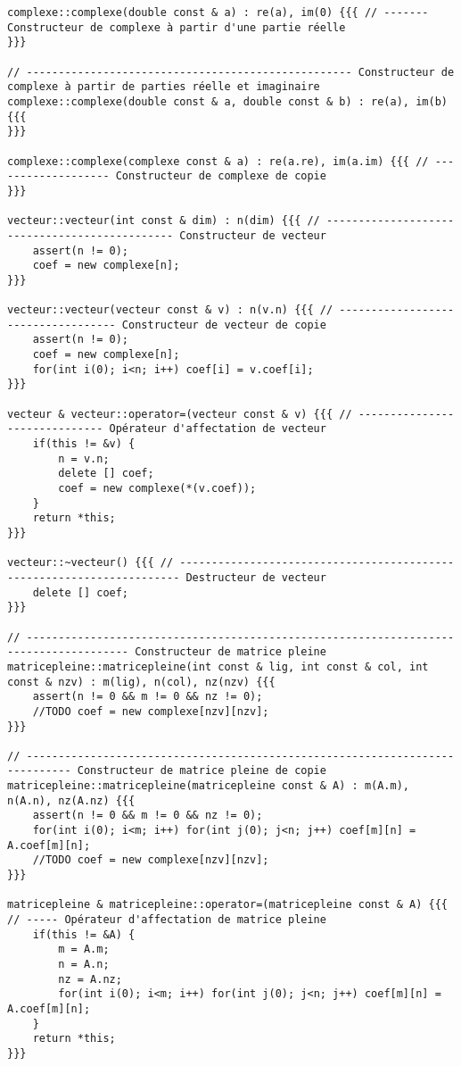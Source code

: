 \documentclass[a4paper]{article}
\begin{document}
\begin{verbatim}
complexe::complexe(double const & a) : re(a), im(0) {{{ // ------- Constructeur de complexe à partir d'une partie réelle
}}}

// --------------------------------------------------- Constructeur de complexe à partir de parties réelle et imaginaire
complexe::complexe(double const & a, double const & b) : re(a), im(b) {{{ 
}}}

complexe::complexe(complexe const & a) : re(a.re), im(a.im) {{{ // ------------------- Constructeur de complexe de copie
}}}

vecteur::vecteur(int const & dim) : n(dim) {{{ // ---------------------------------------------- Constructeur de vecteur
    assert(n != 0);
    coef = new complexe[n];
}}}

vecteur::vecteur(vecteur const & v) : n(v.n) {{{ // ----------------------------------- Constructeur de vecteur de copie
    assert(n != 0);
    coef = new complexe[n];
    for(int i(0); i<n; i++) coef[i] = v.coef[i];
}}}

vecteur & vecteur::operator=(vecteur const & v) {{{ // ------------------------------ Opérateur d'affectation de vecteur
    if(this != &v) {
        n = v.n;
        delete [] coef;
        coef = new complexe(*(v.coef));
    }
    return *this;
}}}

vecteur::~vecteur() {{{ // ---------------------------------------------------------------------- Destructeur de vecteur
    delete [] coef;
}}}

// -------------------------------------------------------------------------------------- Constructeur de matrice pleine
matricepleine::matricepleine(int const & lig, int const & col, int const & nzv) : m(lig), n(col), nz(nzv) {{{ 
    assert(n != 0 && m != 0 && nz != 0);
    //TODO coef = new complexe[nzv][nzv];
}}}

// ----------------------------------------------------------------------------- Constructeur de matrice pleine de copie
matricepleine::matricepleine(matricepleine const & A) : m(A.m), n(A.n), nz(A.nz) {{{ 
    assert(n != 0 && m != 0 && nz != 0);
    for(int i(0); i<m; i++) for(int j(0); j<n; j++) coef[m][n] = A.coef[m][n];
    //TODO coef = new complexe[nzv][nzv];
}}}

matricepleine & matricepleine::operator=(matricepleine const & A) {{{ // ----- Opérateur d'affectation de matrice pleine
    if(this != &A) {
        m = A.m;
        n = A.n;
        nz = A.nz;
        for(int i(0); i<m; i++) for(int j(0); j<n; j++) coef[m][n] = A.coef[m][n];
    }
    return *this;
}}}


\end{verbatim}
\end{document}
